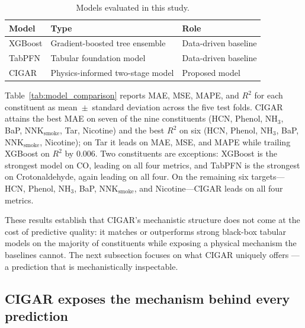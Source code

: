 \documentclass[11pt]{article}
\begin{document}
\begin{table}[H]
    \centering
    \caption{Models evaluated in this study.}
    \label{tab:model_experiments}
    \begin{tabular}{lll}
        \toprule
        Model & Type & Role \\
        \midrule
        XGBoost & Gradient-boosted tree ensemble & Data-driven baseline \\
        TabPFN  & Tabular foundation model & Data-driven baseline \\
        CIGAR   & Physics-informed two-stage model & Proposed model \\
        \bottomrule
    \end{tabular}
\end{table}

Table~\ref{tab:model_comparison} reports MAE, MSE, MAPE, and $R^2$ for
each constituent as mean~$\pm$~standard deviation across the five test
folds. CIGAR attains the best MAE on seven of the nine constituents (HCN,
Phenol, NH$_3$, BaP, $\mathrm{NNK}_{\mathrm{smoke}}$, Tar, Nicotine) and the best $R^2$ on six (HCN,
Phenol, NH$_3$, BaP, $\mathrm{NNK}_{\mathrm{smoke}}$, Nicotine); on Tar it leads on MAE, MSE, and
MAPE while trailing XGBoost on $R^2$ by 0.006. Two constituents are
exceptions: XGBoost is the strongest model on CO, leading on all four
metrics, and TabPFN is the strongest on Crotonaldehyde, again leading on
all four. On the remaining six targets---HCN, Phenol, NH$_3$, BaP,
$\mathrm{NNK}_{\mathrm{smoke}}$, and Nicotine---CIGAR leads on all four metrics.



These results establish that CIGAR's mechanistic structure does not come
at the cost of predictive quality: it matches or outperforms strong
black-box tabular models on the majority of constituents while exposing a
physical mechanism the baselines cannot. The next subsection focuses on
what CIGAR uniquely offers --- a prediction that is mechanistically
inspectable.

\subsection*{CIGAR exposes the mechanism behind every prediction}
\end{document}
